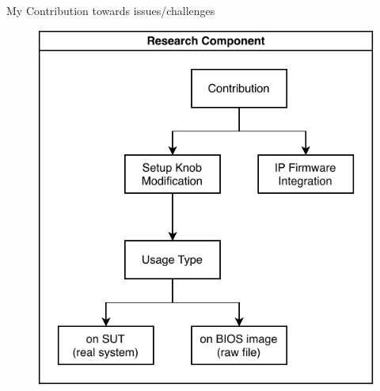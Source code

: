 
\begin{frame}{My Contribution towards issues/challenges}
    \begin{figure}
        \centering
        \includegraphics[width=0.6\linewidth]{Im/figures/research-component.pdf}
        \label{fig:research-component}
    \end{figure}
\end{frame}

